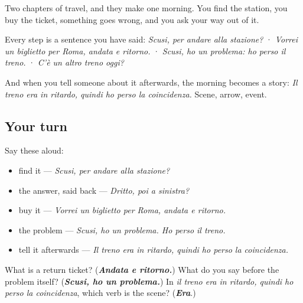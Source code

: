 \begin{grammarlens}[title={What you've built}]
Two chapters of travel, and they make one morning. You find the station, you buy the ticket, something goes wrong, and you ask your way out of it.

Every step is a sentence you have said: \emph{Scusi, per andare alla stazione?} · \emph{Vorrei un biglietto per Roma, andata e ritorno.} · \emph{Scusi, ho un problema: ho perso il treno.} · \emph{C'è un altro treno oggi?}

And when you tell someone about it afterwards, the morning becomes a story: \emph{Il treno era in ritardo, quindi ho perso la coincidenza.} Scene, arrow, event.
\end{grammarlens}

\subsection*{Your turn}
Say these aloud:

\begin{itemize}
\raggedright
  \item find it — \emph{Scusi, per andare alla stazione?}
  \item the answer, said back — \emph{Dritto, poi a sinistra?}
  \item buy it — \emph{Vorrei un biglietto per Roma, andata e ritorno.}
  \item the problem — \emph{Scusi, ho un problema. Ho perso il treno.}
  \item tell it afterwards — \emph{Il treno era in ritardo, quindi ho perso la coincidenza.}
\end{itemize}

\begin{tcolorbox}[breakable,colback=teal!4,colframe=teal!35!black,title={Before you move on}]
What is a return ticket? (\emph{\textbf{Andata e ritorno.}}) What do you say before the problem itself? (\emph{\textbf{Scusi, ho un problema.}}) In \emph{il treno era in ritardo, quindi ho perso la coincidenza}, which verb is the scene? (\emph{\textbf{Era}}.)
\end{tcolorbox}
